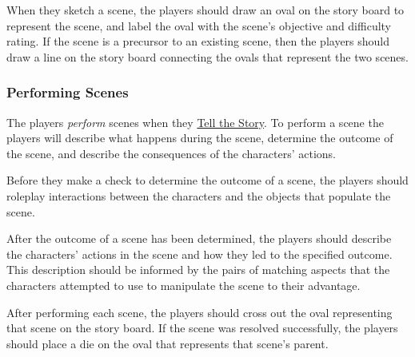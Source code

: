 \documentclass[12pt, a5paper, parskip=half-]{scrartcl}
\begin{document}
When they sketch a scene, the players should draw an oval on the story board to represent the scene, and label the oval with the scene's objective and difficulty rating.
If the scene is a precursor to an existing scene, then the players should draw a line on the story board connecting the ovals that represent the two scenes.

\subsubsection*{Performing Scenes} \label{subsubsection:performing-scenes}
The players \emph{perform} scenes when they \hyperref[subsection:tell-the-story]{\cinzel \small Tell the Story}.
To perform a scene the players will describe what happens during the scene, determine the outcome of the scene, and describe the consequences of the characters' actions.

Before they make a check to determine the outcome of a scene, the players should roleplay interactions between the characters and the objects that populate the scene.

After the outcome of a scene has been determined, the players should describe the characters' actions in the scene and how they led to the specified outcome.
This description should be informed by the pairs of matching aspects that the characters attempted to use to manipulate the scene to their advantage.

After performing each scene, the players should cross out the oval representing that scene on the story board. If the scene was resolved successfully, the players should place a die on the oval that represents that scene's parent.
\newpage
\end{document}
